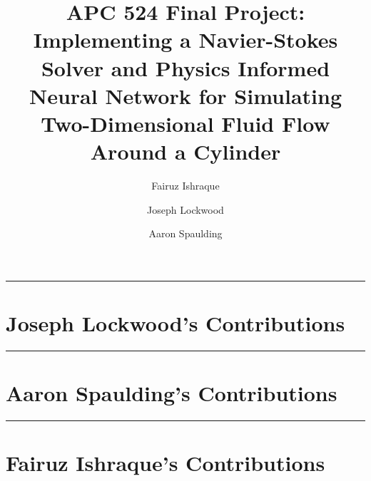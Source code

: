 \documentclass[11pt, letterpaper]{article}
\title{\titlefontlarge APC 524 Final Project:\\\titlefont Implementing a Navier-Stokes Solver and Physics Informed Neural Network for Simulating Two-Dimensional Fluid Flow Around a Cylinder}
\author[1]{Fairuz Ishraque}
\author[1]{Joseph Lockwood}
\author[2]{Aaron Spaulding}
\affil[1]{Department of Geosciences}
\affil[2]{Department of Civil and Environmental Engineering}
\date{}
\begin{document}
\maketitle
\newpage 
\tableofcontents

\newpage
\setcounter{page}{1}



\rule{\linewidth}{0.5pt}
\section{Joseph Lockwood's Contributions}


\rule{\linewidth}{0.5pt}
\section{Aaron Spaulding's Contributions}


\rule{\linewidth}{0.5pt}
\newpage
\section{Fairuz Ishraque's Contributions}



\newpage
\printbibliography
\end{document}

